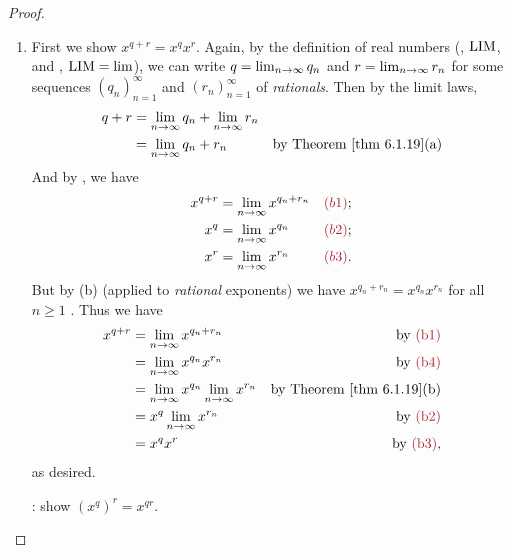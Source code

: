 \begin{proof}
\begin{enumerate}
\item
    First we show \(x^{q + r} = x^q x^r\).
    Again, by the definition of real numbers (, \(\text{LIM}\), and , \(\text{LIM} = \lim\)), we can write \(q = \lim_{n \to \infty} q_n\) and \(r = \lim_{n \to \infty} r_n\) for some sequences \((q_n)_{n = 1}^{\infty}\) and \((r_n)_{n = 1}^{\infty}\) of \emph{rationals}.
    Then by the limit laws,
    \begin{align*}
        q + r & = \lim_{n \toINF} q_n + \lim_{n \toINF} r_n \\
              & = \lim_{n \toINF} q_n + r_n & \text{by \THM{6.1.19}(a)}
    \end{align*}
    And by , we have
    \begin{align*}
        x^{q + r} & = \lim_{n \toINF} x^{q_n + r_n} & \MAROON{(b1)}; \\
              x^q & = \lim_{n \toINF} x^{q_n} & \MAROON{(b2)}; \\
              x^r & = \lim_{n \toINF} x^{r_n} & \MAROON{(b3)}.
    \end{align*}
    But by (b) (applied to \emph{rational} exponents) we have \(x^{q_n + r_n} = x^{q_n} x^{r_n}\) for all \(n \ge 1\) .
    Thus we have
    \begin{align*}
        x^{q + r} & = \lim_{n \toINF} x^{q_n + r_n} & \text{by \MAROON{(b1)}} \\
                  & = \lim_{n \toINF} x^{q_n} x^{r_n} & \text{by \MAROON{(b4)}} \\
                  & = \lim_{n \toINF} x^{q_n} \lim_{n \toINF} x^{r_n} & \text{by \THM{6.1.19}(b)} \\
                  & = x^q \lim_{n \toINF} x^{r_n} & \text{by \MAROON{(b2)}} \\
                  & = x^q x^r & \text{by \MAROON{(b3)}},
    \end{align*}
    as desired.
    
    : show \((x^q)^r = x^{qr}\).


\end{enumerate}
\end{proof}
